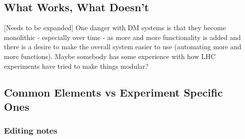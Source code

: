 \subsection{What Works, What Doesn't}
[Needs to be expanded] One danger with DM systems is that they become monolithic - especially over time - as more 
and more functionality is added and there is a desire to make the overall system easier to use (automating more 
and more functions). Maybe somebody has some experience with how LHC experiments have tried to make things modular?


\subsection{Common Elements vs Experiment Specific Ones}



\subsubsection{Editing notes}


